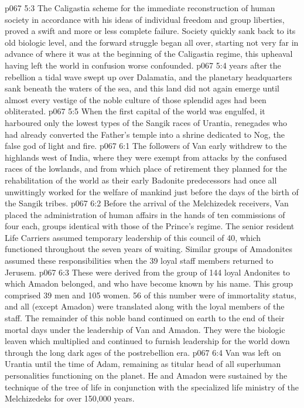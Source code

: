 \vs p067 5:3 The Caligastia scheme for the immediate reconstruction of human society in accordance with his ideas of individual freedom and group liberties, proved a swift and more or less complete failure. Society quickly sank back to its old biologic level, and the forward struggle began all over, starting not very far in advance of where it was at the beginning of the Caligastia regime, this upheaval having left the world in confusion worse confounded.
\vs p067 5:4  years after the rebellion a tidal wave swept up over Dalamatia, and the planetary headquarters sank beneath the waters of the sea, and this land did not again emerge until almost every vestige of the noble culture of those splendid ages had been obliterated.
\vs p067 5:5 When the first capital of the world was engulfed, it harboured only the lowest types of the Sangik races of Urantia, renegades who had already converted the Father’s temple into a shrine dedicated to Nog, the false god of light and fire.
\vs p067 6:1 The followers of Van early withdrew to the highlands west of India, where they were exempt from attacks by the confused races of the lowlands, and from which place of retirement they planned for the rehabilitation of the world as their early Badonite predecessors had once all unwittingly worked for the welfare of mankind just before the days of the birth of the Sangik tribes.
\vs p067 6:2 Before the arrival of the Melchizedek receivers, Van placed the administration of human affairs in the hands of ten commissions of four each, groups identical with those of the Prince’s regime. The senior resident Life Carriers assumed temporary leadership of this council of 40, which functioned throughout the seven years of waiting. Similar groups of Amadonites assumed these responsibilities when the 39 loyal staff members returned to Jerusem.
\vs p067 6:3 These  were derived from the group of 144 loyal Andonites to which Amadon belonged, and who have become known by his name. This group comprised 39 men and 105 women. 56 of this number were of immortality status, and all (except Amadon) were translated along with the loyal members of the staff. The remainder of this noble band continued on earth to the end of their mortal days under the leadership of Van and Amadon. They were the biologic leaven which multiplied and continued to furnish leadership for the world down through the long dark ages of the postrebellion era.
\vs p067 6:4 Van was left on Urantia until the time of Adam, remaining as titular head of all superhuman personalities functioning on the planet. He and Amadon were sustained by the technique of the tree of life in conjunction with the specialized life ministry of the Melchizedeks for over 150,000 years.
